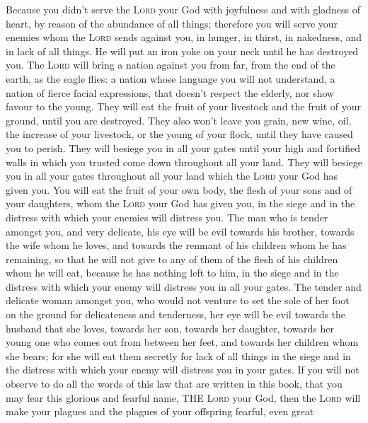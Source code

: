  Because you didn't serve the \textsc{Lord} your God with
joyfulness and with gladness of heart, by reason of the abundance of all
things;  therefore you will serve your enemies whom the
\textsc{Lord} sends against you, in hunger, in thirst, in nakedness, and
in lack of all things. He will put an iron yoke on your neck until he
has destroyed you.  The \textsc{Lord} will bring a nation
against you from far, from the end of the earth, as the eagle flies: a
nation whose language you will not understand,  a nation
of fierce facial expressions, that doesn't respect the elderly, nor show
favour to the young.  They will eat the fruit of your
livestock and the fruit of your ground, until you are destroyed. They
also won't leave you grain, new wine, oil, the increase of your
livestock, or the young of your flock, until they have caused you to
perish.  They will besiege you in all your gates until
your high and fortified walls in which you trusted come down throughout
all your land. They will besiege you in all your gates throughout all
your land which the \textsc{Lord} your God has given you.
 You will eat the fruit of your own body, the flesh of
your sons and of your daughters, whom the \textsc{Lord} your God has
given you, in the siege and in the distress with which your enemies will
distress you.  The man who is tender amongst you, and
very delicate, his eye will be evil towards his brother, towards the
wife whom he loves, and towards the remnant of his children whom he has
remaining,  so that he will not give to any of them of
the flesh of his children whom he will eat, because he has nothing left
to him, in the siege and in the distress with which your enemy will
distress you in all your gates.  The tender and delicate
woman amongst you, who would not venture to set the sole of her foot on
the ground for delicateness and tenderness, her eye will be evil towards
the husband that she loves, towards her son, towards her daughter,
 towards her young one who comes out from between her
feet, and towards her children whom she bears; for she will eat them
secretly for lack of all things in the siege and in the distress with
which your enemy will distress you in your gates.  If you
will not observe to do all the words of this law that are written in
this book, that you may fear this glorious and fearful name, THE
\textsc{Lord} your God,  then the \textsc{Lord} will make
your plagues and the plagues of your offspring fearful, even great
